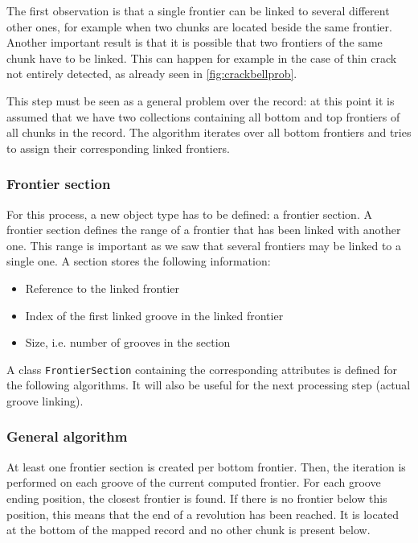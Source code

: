 The first observation is that a single frontier can be linked to several different other ones, for example when two chunks are located beside the same frontier. Another important result is that it is possible that two frontiers of the same chunk have to be linked. This can happen for example in the case of thin crack not entirely detected, as already seen in \autoref{fig:crackbellprob}.

This step must be seen as a general problem over the record: at this point it is assumed that we have two collections containing all bottom and top frontiers of all chunks in the record. The algorithm iterates over all bottom frontiers and tries to assign their corresponding linked frontiers.

\subsubsection{Frontier section}

For this process, a new object type has to be defined: a frontier section. A frontier section defines the range of a frontier that has been linked with another one. This range is important as we saw that several frontiers may be linked to a single one. A section stores the following information:

\begin{itemize}
\item Reference to the linked frontier
\item Index of the first linked groove in the linked frontier
\item Size, i.e. number of grooves in the section
\end{itemize}

A class \texttt{FrontierSection} containing the corresponding attributes is defined for the following algorithms. It will also be useful for the next processing step (actual groove linking).

\subsubsection{General algorithm}

At least one frontier section is created per bottom frontier. Then, the iteration is performed on each groove of the current computed frontier. For each groove ending position, the closest frontier is found. If there is no frontier below this position, this means that the end of a revolution has been reached. It is located at the bottom of the mapped record and no other chunk is present below.

